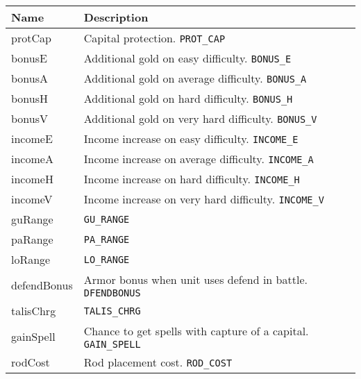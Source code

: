 \begin{center}
\begin{tabularx}{\linewidth}{| l | X |}
\hline
\textbf{Name} & \textbf{Description}\\
\hline
protCap & Capital protection. \texttt{PROT\_CAP}\\
\hline
bonusE & Additional gold on easy difficulty. \texttt{BONUS\_E}\\
\hline
bonusA & Additional gold on average difficulty. \texttt{BONUS\_A}\\
\hline
bonusH & Additional gold on hard difficulty. \texttt{BONUS\_H}\\
\hline
bonusV & Additional gold on very hard difficulty. \texttt{BONUS\_V}\\
\hline
incomeE & Income increase on easy difficulty. \texttt{INCOME\_E}\\
\hline
incomeA & Income increase on average difficulty. \texttt{INCOME\_A}\\
\hline
incomeH & Income increase on hard difficulty. \texttt{INCOME\_H}\\
\hline
incomeV & Income increase on very hard difficulty. \texttt{INCOME\_V}\\
\hline
guRange & \texttt{GU\_RANGE}\\
\hline
paRange & \texttt{PA\_RANGE}\\
\hline
loRange & \texttt{LO\_RANGE}\\
\hline
defendBonus & Armor bonus when unit uses defend in battle. \texttt{DFENDBONUS}\\
\hline
talisChrg & \texttt{TALIS\_CHRG}\\
\hline
gainSpell & Chance to get spells with capture of a capital. \texttt{GAIN\_SPELL}\\
\hline
rodCost & Rod placement cost. \texttt{ROD\_COST}\\
\hline
\end{tabularx}
\end{center}
